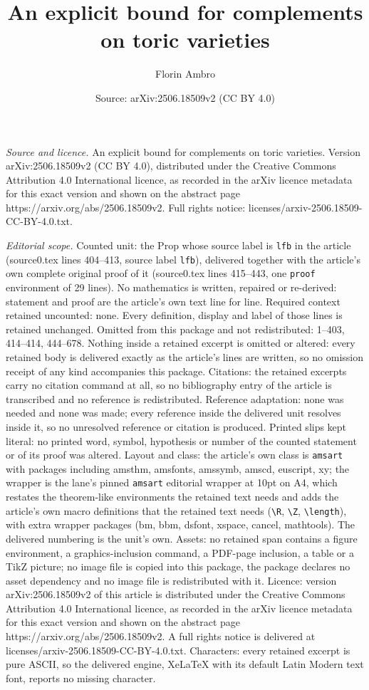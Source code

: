 \documentclass[10pt,a4paper]{amsart}
\title[An explicit bound for complements on toric varieties]{An explicit bound for complements on toric varieties}
\author{Florin Ambro}
\date{Source: arXiv:2506.18509v2 (CC BY 4.0)}
\begin{document}
\maketitle

\noindent\emph{Source and licence.} An explicit bound for complements on toric varieties. Version arXiv:2506.18509v2 (CC BY 4.0), distributed under the Creative Commons Attribution 4.0 International licence, as recorded in the arXiv licence metadata for this exact version and shown on the abstract page https://arxiv.org/abs/2506.18509v2. Full rights notice: licenses/arxiv-2506.18509-CC-BY-4.0.txt.\par\smallskip

\noindent\textit{Editorial scope.} Counted unit: the Prop whose source label is \texttt{lfb} in the article (source0.tex lines 404--413, source label \texttt{lfb}), delivered together with the article's own complete original proof of it (source0.tex lines 415--443, one \texttt{proof} environment of 29 lines). No mathematics is written, repaired or re-derived: statement and proof are the article's own text line for line. Required context retained uncounted: none. Every definition, display and label of those lines is retained unchanged. Omitted from this package and not redistributed: 1--403, 414--414, 444--678. Nothing inside a retained excerpt is omitted or altered: every retained body is delivered exactly as the article's lines are written, so no omission receipt of any kind accompanies this package. Citations: the retained excerpts carry no citation command at all, so no bibliography entry of the article is transcribed and no reference is redistributed. Reference adaptation: none was needed and none was made; every reference inside the delivered unit resolves inside it, so no unresolved reference or citation is produced. Printed slips kept literal: no printed word, symbol, hypothesis or number of the counted statement or of its proof was altered. Layout and class: the article's own class is \texttt{amsart} with packages including amsthm, amsfonts, amssymb, amscd, euscript, xy; the wrapper is the lane's pinned \texttt{amsart} editorial wrapper at 10pt on A4, which restates the theorem-like environments the retained text needs and adds the article's own macro definitions that the retained text needs (\texttt{\textbackslash R}, \texttt{\textbackslash Z}, \texttt{\textbackslash length}), with extra wrapper packages (bm, bbm, dsfont, xspace, cancel, mathtools). The delivered numbering is the unit's own. Assets: no retained span contains a figure environment, a graphics-inclusion command, a PDF-page inclusion, a table or a TikZ picture; no image file is copied into this package, the package declares no asset dependency and no image file is redistributed with it. Licence: version arXiv:2506.18509v2 of this article is distributed under the Creative Commons Attribution 4.0 International licence, as recorded in the arXiv licence metadata for this exact version and shown on the abstract page https://arxiv.org/abs/2506.18509v2. A full rights notice is delivered at licenses/arxiv-2506.18509-CC-BY-4.0.txt. Characters: every retained excerpt is pure ASCII, so the delivered engine, XeLaTeX with its default Latin Modern text font, reports no missing character.
\end{document}
